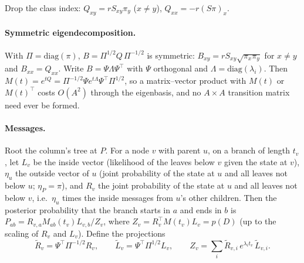 \documentclass[11pt]{article}
\begin{document}
Drop the class index: $Q_{xy}=rS_{xy}\pi_y$ ($x\ne y$), $Q_{xx}=-r(S\pi)_x$.

\paragraph{Symmetric eigendecomposition.} With $\Pi=\mathrm{diag}(\pi)$,
$B=\Pi^{1/2}Q\,\Pi^{-1/2}$ is symmetric:
$B_{xy}=rS_{xy}\sqrt{\pi_x\pi_y}$ for $x\ne y$ and $B_{xx}=Q_{xx}$. Write
$B=\Psi\Lambda\Psi^\top$ with $\Psi$ orthogonal and $\Lambda=\mathrm{diag}(\lambda_i)$.
Then $M(t)=e^{tQ}=\Pi^{-1/2}\Psi e^{t\Lambda}\Psi^\top\Pi^{1/2}$, so a
matrix--vector product with $M(t)$ or $M(t)^\top$ costs $O(A^2)$ through the
eigenbasis, and no $A\times A$ transition matrix need ever be formed.

\paragraph{Messages.} Root the column's tree at $P$. For a node $v$ with
parent $u$, on a branch of length $t_v$, let $L_v$ be the inside vector
(likelihood of the leaves below $v$ given the state at $v$), $\eta_u$ the
outside vector of $u$ (joint probability of the state at $u$ and all leaves
not below $u$; $\eta_P=\pi$), and $R_v$ the joint probability of the state at
$u$ and all leaves not below $v$, i.e.\ $\eta_u$ times the inside messages
from $u$'s other children. Then the posterior probability that the branch starts
in $a$ and ends in $b$ is $P_{ab}=R_{v,a}M_{ab}(t_v)L_{v,b}/Z_v$, where
$Z_v=R_v^\top M(t_v)L_v=p(D)$ (up to the scaling of $R_v$ and $L_v$). Define
the projections
\[
\tilde R_v=\Psi^\top\Pi^{-1/2}R_v,\qquad \tilde L_v=\Psi^\top\Pi^{1/2}L_v,
\qquad Z_v=\sum_i\tilde R_{v,i}\,e^{\lambda_it_v}\,\tilde L_{v,i}.
\]
\end{document}
